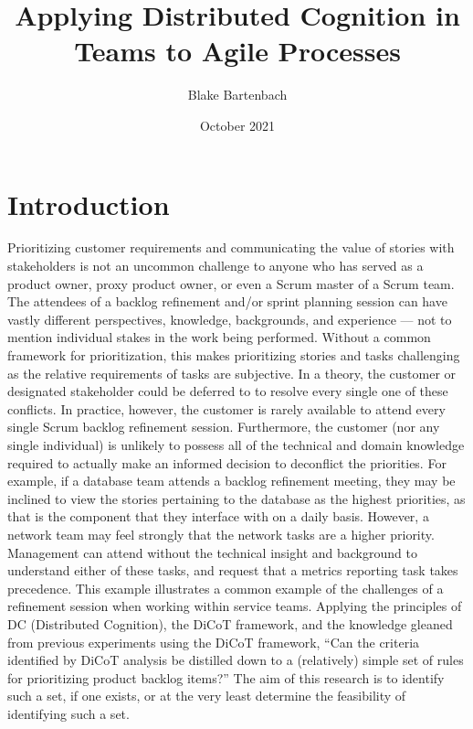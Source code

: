 \documentclass[acmsmall,screen,authorversion]{acmart}
\begin{document}
\title{Applying Distributed Cognition in Teams to Agile Processes}

\author{Blake Bartenbach}
\date{October 2021}

\begin{abstract}

\end{abstract}

\maketitle

\section{Introduction}
Prioritizing customer requirements and communicating the value of stories with stakeholders is not an uncommon challenge to anyone who has served as a product owner, proxy product owner, or even a Scrum master of a Scrum team. The attendees of a backlog refinement and/or sprint planning session can have vastly different perspectives, knowledge, backgrounds, and experience --- not to mention individual stakes in the work being performed. Without a common framework for prioritization, this makes prioritizing stories and tasks challenging as the relative requirements of tasks are subjective. 
In a theory, the customer or designated stakeholder could be deferred to to resolve every single one of these conflicts. In practice, however, the customer is rarely available to attend every single Scrum backlog refinement session. Furthermore, the customer (nor any single individual) is unlikely to possess all of the technical and domain knowledge required to actually make an informed decision to deconflict the priorities.
For example, if a database team attends a backlog refinement meeting, they may be inclined to view the stories pertaining to the database as the highest priorities, as that is the component that they interface with on a daily basis. However, a network team may feel strongly that the network tasks are a higher priority. Management can attend without the technical insight and background to understand either of these tasks, and request that a metrics reporting task takes precedence. This example illustrates a common example of the challenges of a refinement session
when working within service teams.
Applying the principles of DC (Distributed Cognition), the DiCoT framework, and the knowledge gleaned from previous experiments using the DiCoT framework, ``Can the criteria identified by DiCoT analysis be distilled down to a (relatively) simple set of rules for prioritizing product backlog items?'' The aim of this research is to identify such a set, if one exists, or at the very least determine the feasibility of identifying such a set.
\end{document}
